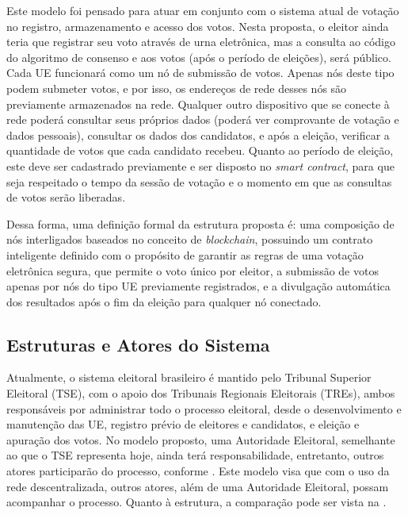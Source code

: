 \documentclass[portuguese]{textolivre}
\begin{document}
	Este modelo foi pensado para atuar em conjunto com o sistema atual de votação no registro, armazenamento e acesso dos votos. Nesta proposta, o eleitor ainda teria que registrar seu voto através de urna eletrônica, mas a consulta ao código do algoritmo de consenso e aos votos (após o período de eleições), será público. Cada UE funcionará como um nó de submissão de votos. Apenas nós deste tipo podem submeter votos, e por isso, os endereços de rede desses nós são previamente armazenados na rede. Qualquer outro dispositivo que se conecte à rede poderá consultar seus próprios dados (poderá ver comprovante de votação e dados pessoais), consultar os dados dos candidatos, e após a eleição, verificar a quantidade de votos que cada candidato recebeu. Quanto ao período de eleição, este deve ser cadastrado previamente e ser disposto no \emph{smart contract}, para que seja respeitado o tempo da sessão de votação e o momento em que as consultas de votos serão liberadas. 
	
	Dessa forma, uma definição formal da estrutura proposta é: uma composição de nós interligados baseados no conceito de \emph{blockchain}, possuindo um contrato inteligente definido com o propósito de garantir as regras de uma votação eletrônica segura, que permite o voto único por eleitor, a submissão de votos apenas por nós do tipo UE previamente registrados, e a divulgação automática dos resultados após o fim da eleição para qualquer nó conectado.
	
	\subsection{Estruturas e Atores do Sistema}
	
	
	Atualmente, o sistema eleitoral brasileiro é mantido pelo Tribunal Superior Eleitoral (TSE), com o apoio dos Tribunais Regionais Eleitorais (TREs), ambos responsáveis por administrar todo o processo eleitoral, desde o desenvolvimento e manutenção das UE, registro prévio de eleitores e candidatos, e eleição e apuração dos votos. No modelo proposto, uma Autoridade Eleitoral, semelhante ao que o TSE representa hoje, ainda terá responsabilidade, entretanto, outros atores participarão do processo, conforme . Este modelo visa que com o uso da rede descentralizada, outros atores, além de uma Autoridade Eleitoral, possam acompanhar o processo. Quanto à estrutura, a comparação pode ser vista na .
	
	
	
\end{document}
